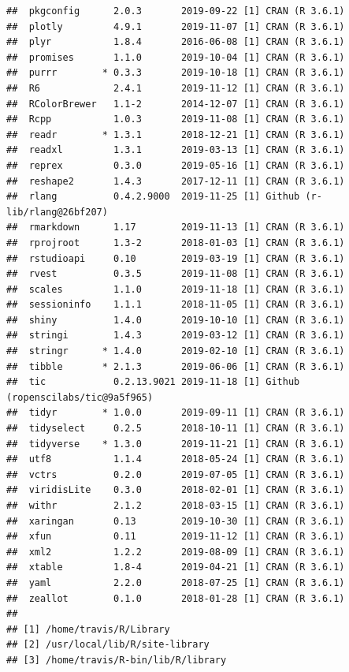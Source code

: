 \documentclass[]{book}
\begin{document}
\begin{verbatim}
##  pkgconfig      2.0.3       2019-09-22 [1] CRAN (R 3.6.1)                   
##  plotly         4.9.1       2019-11-07 [1] CRAN (R 3.6.1)                   
##  plyr           1.8.4       2016-06-08 [1] CRAN (R 3.6.1)                   
##  promises       1.1.0       2019-10-04 [1] CRAN (R 3.6.1)                   
##  purrr        * 0.3.3       2019-10-18 [1] CRAN (R 3.6.1)                   
##  R6             2.4.1       2019-11-12 [1] CRAN (R 3.6.1)                   
##  RColorBrewer   1.1-2       2014-12-07 [1] CRAN (R 3.6.1)                   
##  Rcpp           1.0.3       2019-11-08 [1] CRAN (R 3.6.1)                   
##  readr        * 1.3.1       2018-12-21 [1] CRAN (R 3.6.1)                   
##  readxl         1.3.1       2019-03-13 [1] CRAN (R 3.6.1)                   
##  reprex         0.3.0       2019-05-16 [1] CRAN (R 3.6.1)                   
##  reshape2       1.4.3       2017-12-11 [1] CRAN (R 3.6.1)                   
##  rlang          0.4.2.9000  2019-11-25 [1] Github (r-lib/rlang@26bf207)     
##  rmarkdown      1.17        2019-11-13 [1] CRAN (R 3.6.1)                   
##  rprojroot      1.3-2       2018-01-03 [1] CRAN (R 3.6.1)                   
##  rstudioapi     0.10        2019-03-19 [1] CRAN (R 3.6.1)                   
##  rvest          0.3.5       2019-11-08 [1] CRAN (R 3.6.1)                   
##  scales         1.1.0       2019-11-18 [1] CRAN (R 3.6.1)                   
##  sessioninfo    1.1.1       2018-11-05 [1] CRAN (R 3.6.1)                   
##  shiny          1.4.0       2019-10-10 [1] CRAN (R 3.6.1)                   
##  stringi        1.4.3       2019-03-12 [1] CRAN (R 3.6.1)                   
##  stringr      * 1.4.0       2019-02-10 [1] CRAN (R 3.6.1)                   
##  tibble       * 2.1.3       2019-06-06 [1] CRAN (R 3.6.1)                   
##  tic            0.2.13.9021 2019-11-18 [1] Github (ropenscilabs/tic@9a5f965)
##  tidyr        * 1.0.0       2019-09-11 [1] CRAN (R 3.6.1)                   
##  tidyselect     0.2.5       2018-10-11 [1] CRAN (R 3.6.1)                   
##  tidyverse    * 1.3.0       2019-11-21 [1] CRAN (R 3.6.1)                   
##  utf8           1.1.4       2018-05-24 [1] CRAN (R 3.6.1)                   
##  vctrs          0.2.0       2019-07-05 [1] CRAN (R 3.6.1)                   
##  viridisLite    0.3.0       2018-02-01 [1] CRAN (R 3.6.1)                   
##  withr          2.1.2       2018-03-15 [1] CRAN (R 3.6.1)                   
##  xaringan       0.13        2019-10-30 [1] CRAN (R 3.6.1)                   
##  xfun           0.11        2019-11-12 [1] CRAN (R 3.6.1)                   
##  xml2           1.2.2       2019-08-09 [1] CRAN (R 3.6.1)                   
##  xtable         1.8-4       2019-04-21 [1] CRAN (R 3.6.1)                   
##  yaml           2.2.0       2018-07-25 [1] CRAN (R 3.6.1)                   
##  zeallot        0.1.0       2018-01-28 [1] CRAN (R 3.6.1)                   
## 
## [1] /home/travis/R/Library
## [2] /usr/local/lib/R/site-library
## [3] /home/travis/R-bin/lib/R/library
\end{verbatim}
\end{document}
